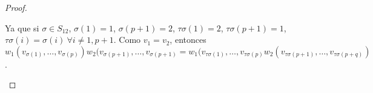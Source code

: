 \documentclass[cursovd_portada.tex]{subfiles}
\begin{document}
\begin{nota}
\begin{proof}
\begin{enumerate}
Ya que si $\sigma\in S_{12}$, $\sigma(1)=1$, $\sigma(p+1)=2$, $\tau\sigma(1)=2$, $\tau\sigma(p+1)=1$, $\tau\sigma(i)=\sigma(i)\ \forall i\neq 1,p+1$. Como $v_1=v_2$, entonces $w_1(v_{\sigma(1)},\dots,v_{\sigma(p)})w_2(v_{\sigma(p+1)},\dots, v_{\sigma(p+1)}=w_1(v_{\tau\sigma(1)},\dots, v_{\tau\sigma(p)}w_2(v_{\tau\sigma(p+1)},\dots, v_{\tau\sigma(p+q)})$.
\end{enumerate}
\end{proof}
\end{nota}
\end{document}
